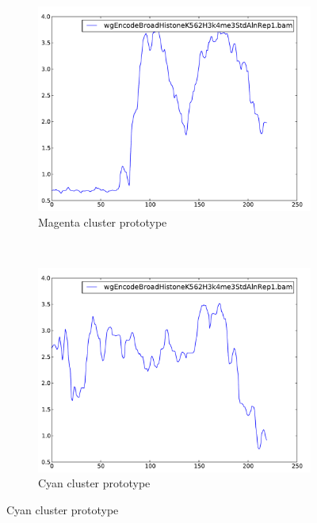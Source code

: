 \documentclass[parskip]{cs4rep}
\begin{document}
\begin{figure}[t,b]
    \centering
    \begin{subfigure}[b]{0.22\textwidth}
        \includegraphics[width=\textwidth]{figures/evaluation/exon_stretching/cluster-1.pdf}
        \caption{Magenta cluster prototype}
        \label{fig:evaluation:exon_stretching:clusters:1:prototype}
    \end{subfigure}
    ~
    \begin{subfigure}[b]{0.22\textwidth}
        \includegraphics[width=\textwidth]{figures/evaluation/exon_stretching/cluster-2.pdf}
        \caption{Cyan cluster prototype}
        \label{fig:evaluation:exon_stretching:clusters:2:prototype}
    \end{subfigure}

\end{figure}
\end{document}
